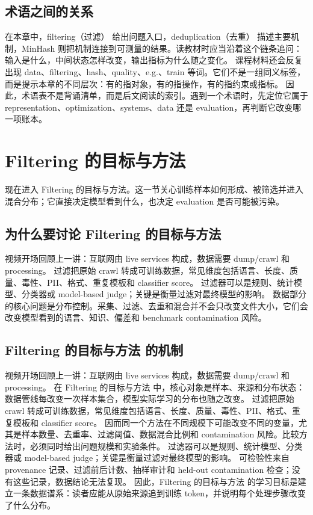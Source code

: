 \documentclass[a4paper]{article}
\begin{document}
\subsection{术语之间的关系}
在本章中，filtering（过滤） 给出问题入口，deduplication（去重） 描述主要机制，MinHash 则把机制连接到可测量的结果。读教材时应当沿着这个链条追问：输入是什么，中间状态怎样改变，输出指标为什么随之变化。
课程材料还会反复出现 data、filtering、hash、quality、e.g.、train 等词。它们不是一组同义标签，而是提示本章的不同层次：有的指对象，有的指操作，有的指约束或指标。
因此，术语表不是背诵清单，而是后文阅读的索引。遇到一个术语时，先定位它属于 representation、optimization、systems、data 还是 evaluation，再判断它改变哪一项账本。
\section{Filtering 的目标与方法}
现在进入 Filtering 的目标与方法。这一节关心训练样本如何形成、被筛选并进入混合分布；它直接决定模型看到什么，也决定 evaluation 是否可能被污染。
\subsection{为什么要讨论 Filtering 的目标与方法}
视频开场回顾上一讲：互联网由 live services 构成，数据需要 dump/crawl 和 processing。
过滤把原始 crawl 转成可训练数据，常见维度包括语言、长度、质量、毒性、PII、格式、重复模板和 classifier score。
过滤器可以是规则、统计模型、分类器或 model-based judge；关键是衡量过滤对最终模型的影响。
数据部分的核心问题是分布控制。采集、过滤、去重和混合并不会只改变文件大小，它们会改变模型看到的语言、知识、偏差和 benchmark contamination 风险。
\subsection{Filtering 的目标与方法 的机制}
视频开场回顾上一讲：互联网由 live services 构成，数据需要 dump/crawl 和 processing。 在 Filtering 的目标与方法 中，核心对象是样本、来源和分布状态：数据管线每改变一次样本集合，模型实际学习的分布也随之改变。
过滤把原始 crawl 转成可训练数据，常见维度包括语言、长度、质量、毒性、PII、格式、重复模板和 classifier score。 因而同一个方法在不同规模下可能改变不同的变量，尤其是样本数量、去重率、过滤阈值、数据混合比例和 contamination 风险。比较方法时，必须同时给出问题规模和实验条件。
过滤器可以是规则、统计模型、分类器或 model-based judge；关键是衡量过滤对最终模型的影响。 可检验性来自 provenance 记录、过滤前后计数、抽样审计和 held-out contamination 检查；没有这些记录，数据结论无法复现。
因此，Filtering 的目标与方法 的学习目标是建立一条数据谱系：读者应能从原始来源追到训练 token，并说明每个处理步骤改变了什么分布。
\end{document}

